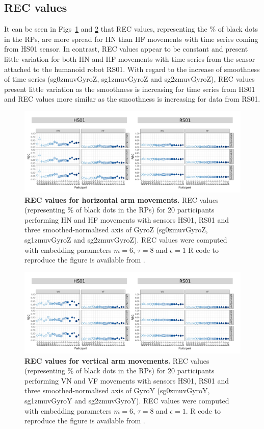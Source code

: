 \subsection{REC values}
It can be seen in Figs~\ref{fig:rec_aH} and \ref{fig:rec_aV} 
that REC values, representing the \% of black dots in the RPs, 
are more spread for HN than HF movements with time 
series coming from HS01 sensor. 
In contrast, REC values appear to be constant and present little variation 
for both HN and HF movements with time series from the sensor attached 
to the humanoid robot RS01.
With regard to the increase of smoothness of time series 
(sg0zmuvGyroZ, sg1zmuvGyroZ and sg2zmuvGyroZ), REC values present little 
variation as the smoothness is increasing for time series from HS01 and 
REC values more similar as the smoothness is increasing for data from RS01.
\begin{figure}[!h]
\centering
\includegraphics[width=1.0\textwidth]{rec_aH}
    \caption{
	{\bf REC values for horizontal arm movements.}	
	REC values (representing \% of black dots in the RPs) for 
	20 participants performing HN and HF movements
	with sensors HS01, RS01 and three smoothed-normalised axis 
	of GyroZ (sg0zmuvGyroZ, sg1zmuvGyroZ and sg2zmuvGyroZ).
	REC values were computed with 
	embedding parameters $m=6$, $\tau=8$ and $\epsilon=1$
	R code to reproduce the figure is available from \cite{hwum2018}.
        }
    \label{fig:rec_aH}
\end{figure}
\begin{figure}[!h]
\centering
\includegraphics[width=1.0\textwidth]{rec_aV}
    \caption{
	{\bf REC values for vertical arm movements.}	
	REC values (representing \% of black dots in the RPs) for 
	20 participants performing VN and VF movements
	with sensors HS01, RS01 and three smoothed-normalised axis 
	of GyroY (sg0zmuvGyroY, sg1zmuvGyroY and sg2zmuvGyroY).
	REC values were computed with 
	embedding parameters $m=6$, $\tau=8$ and $\epsilon=1$.
	R code to reproduce the figure is available from \cite{hwum2018}.
        }
    \label{fig:rec_aV}
\end{figure}
